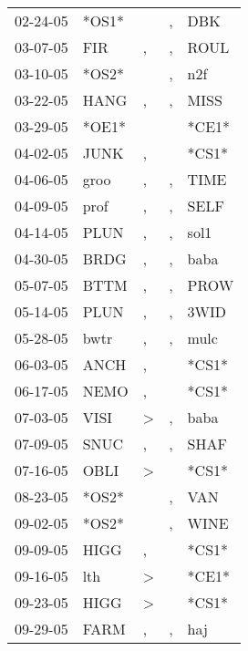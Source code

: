 \begin{supertabular}{lllll}
 02-24-05 &  *OS1* &                  &                , &    DBK \\
 03-07-05 &    FIR &                , &                , &   ROUL \\
 03-10-05 &  *OS2* &                  &                , &    n2f \\
 03-22-05 &   HANG &                , &                , &   MISS \\
 03-29-05 &  *OE1* &                  &                  &  *CE1* \\
 04-02-05 &   JUNK &                , &                  &  *CS1* \\
 04-06-05 &   groo &                , &                , &   TIME \\
 04-09-05 &   prof &                , &                , &   SELF \\
 04-14-05 &   PLUN &                , &                , &   sol1 \\
 04-30-05 &   BRDG &                , &                , &   baba \\
 05-07-05 &   BTTM &                , &                , &   PROW \\
 05-14-05 &   PLUN &                , &                , &   3WID \\
 05-28-05 &   bwtr &                , &                , &   mulc \\
 06-03-05 &   ANCH &                , &                  &  *CS1* \\
 06-17-05 &   NEMO &                , &                  &  *CS1* \\
 07-03-05 &   VISI &     \textgreater &                , &   baba \\
 07-09-05 &   SNUC &                , &                , &   SHAF \\
 07-16-05 &   OBLI &     \textgreater &                  &  *CS1* \\
 08-23-05 &  *OS2* &                  &                , &    VAN \\
 09-02-05 &  *OS2* &                  &                , &   WINE \\
 09-09-05 &   HIGG &                , &                  &  *CS1* \\
 09-16-05 &    lth &     \textgreater &                  &  *CE1* \\
 09-23-05 &   HIGG &     \textgreater &                  &  *CS1* \\
 09-29-05 &   FARM &                , &                , &    haj \\

\end{supertabular}
